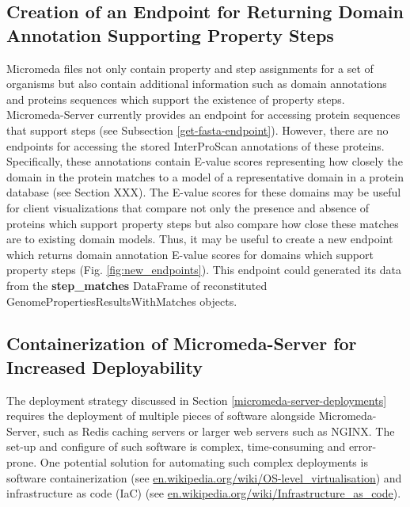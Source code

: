 \subsection{Creation of an Endpoint for Returning Domain Annotation Supporting Property Steps}

Micromeda files not only contain property and step assignments for a set of organisms but also contain additional information such as domain annotations and proteins sequences which support the existence of property steps. Micromeda-Server currently provides an endpoint for accessing protein sequences that support steps (see Subsection \ref{get-fasta-endpoint}). However, there are no endpoints for accessing the stored InterProScan annotations of these proteins. Specifically, these annotations contain E-value scores representing how closely the domain in the protein matches to a model of a representative domain in a protein database (see Section XXX). The E-value scores for these domains may be useful for client visualizations that compare not only the presence and absence of proteins which support property steps but also compare how close these matches are to existing domain models. Thus, it may be useful to create a new endpoint which returns domain annotation E-value scores for domains which support property steps (Fig. \ref{fig:new_endpoints}). This endpoint could generated its data from the \textbf{step\_matches} DataFrame of reconstituted GenomePropertiesResultsWithMatches objects.

\subsection{Containerization of Micromeda-Server for Increased Deployability}

The deployment strategy discussed in Section \ref{micromeda-server-deployments} requires the deployment of multiple pieces of software alongside Micromeda-Server, such as Redis caching servers or larger web servers such as NGINX. The set-up and configure of such software is complex, time-consuming and error-prone. One potential solution for automating such complex deployments is software containerization \cite{syed2015software} (see \href{en.wikipedia.org/wiki/OS-level\_virtualisation}{en.wikipedia.org/wiki/OS-level\_virtualisation}) and infrastructure as code (IaC) \cite{artac2017devops} (see \href{en.wikipedia.org/wiki/Infrastructure\_as\_code}{en.wikipedia.org/wiki/Infrastructure\_as\_code}). 

